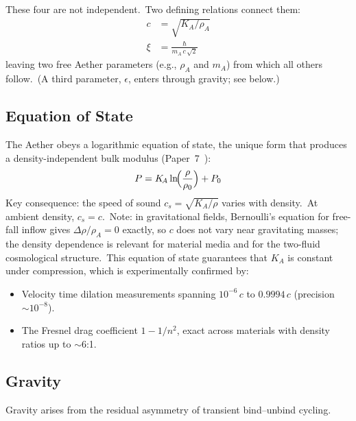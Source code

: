 ﻿\documentclass[12pt,letterpaper]{article}
\newcommand{\rhoa}{\rho_{\!A}}
\newcommand{\Ka}{K_{\!A}}
\begin{document}
These four are not independent.\ Two defining relations connect them:
%
\begin{align}
  c &= \sqrt{\Ka / \rhoa}
    \label{eq:sum-speed-of-light} \\
  \xi &= \frac{\hbar}{m_A\,c\,\sqrt{2}}
    \label{eq:sum-healing-length}
\end{align}
%
leaving two free Aether parameters (e.g., $\rhoa$ and $m_A$) from which all
others follow.\ (A third parameter, $\epsilon$, enters through gravity; see below.)


\subsection{Equation of State}

The Aether obeys a logarithmic equation of state, the unique form that produces
a density-independent bulk modulus (Paper~7~\cite{otto-quantum}):
%
\begin{equation}
  P = \Ka \ln\!\Bigl(\frac{\rho}{\rho_0}\Bigr) + P_0
  \label{eq:sum-eos}
\end{equation}
%
Key consequence: the speed of sound $c_s = \sqrt{\Ka/\rho}$ varies with
density.\ At ambient density, $c_s = c$.\ Note: in gravitational fields,
Bernoulli's equation for free-fall inflow gives $\Delta\rho/\rhoa = 0$
exactly, so $c$ does not vary near gravitating masses; the density
dependence is relevant for material media and for the two-fluid
cosmological structure.\ This equation of state guarantees that $\Ka$ is
constant under compression, which is experimentally confirmed by:
%
\begin{itemize}[leftmargin=2em]
  \item Velocity time dilation measurements spanning $10^{-6}\,c$ to $0.9994\,c$
    (precision $\sim 10^{-8}$).
  \item The Fresnel drag coefficient $1 - 1/n^2$, exact across materials with
    density ratios up to $\sim$6:1.
\end{itemize}


\subsection{Gravity}

Gravity arises from the residual asymmetry of transient bind--unbind cycling.
%
\end{document}
